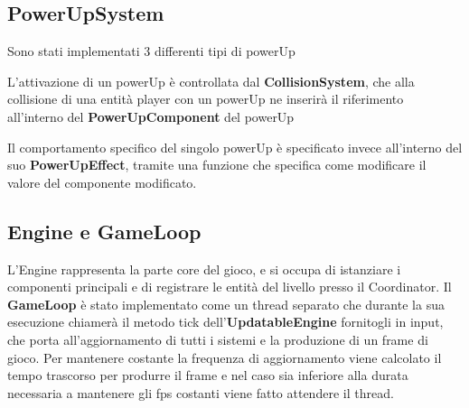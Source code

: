 \subsection{PowerUpSystem}
Sono stati implementati 3 differenti tipi di powerUp

L'attivazione di un powerUp è controllata dal \textbf{CollisionSystem}, che alla collisione di una entità player con un powerUp ne inserirà il riferimento all'interno del \textbf{PowerUpComponent} del powerUp

Il comportamento specifico del singolo powerUp è specificato invece all'interno del suo \textbf{PowerUpEffect}, tramite una funzione che specifica come modificare il valore del componente modificato.


\subsection{Engine e GameLoop}
L'Engine rappresenta la parte core del gioco, e si occupa di istanziare i componenti principali e di registrare le entità del livello presso il Coordinator.
Il \textbf{GameLoop} è stato implementato come un thread separato che durante la sua esecuzione chiamerà il metodo tick dell'\textbf{UpdatableEngine} fornitogli in input, che porta all'aggiornamento di tutti i sistemi e la produzione di un frame di gioco. Per mantenere costante la frequenza di aggiornamento viene calcolato il tempo trascorso per produrre il frame e nel caso sia inferiore alla durata necessaria a mantenere gli fps costanti viene fatto attendere il thread.
